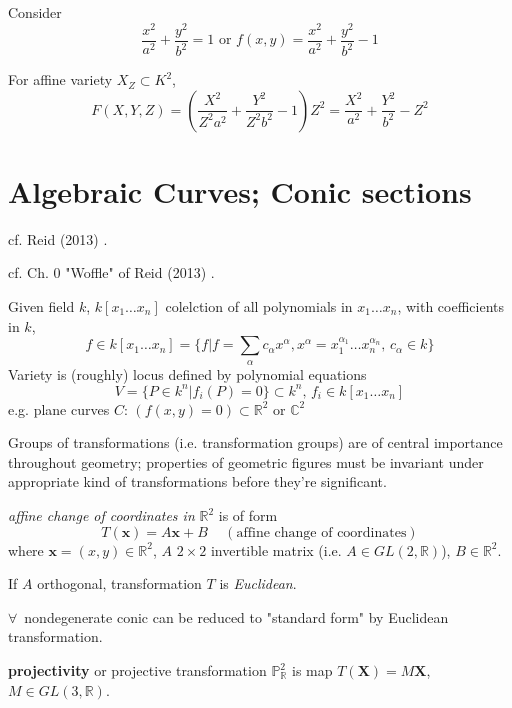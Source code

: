 Consider 
\begin{equation}
\frac{x^2}{a^2} + \frac{y^2}{b^2} = 1 \text{ or } f(x,y) = \frac{x^2}{a^2} + \frac{y^2}{b^2} -1
\end{equation}

For affine variety $X_Z \subset K^2$, 
\begin{equation}
F(X,Y,Z) = \left( \frac{X^2}{Z^2 a^2} + \frac{Y^2}{Z^2 b^2} - 1 \right) Z^2 = \frac{X^2}{a^2} + \frac{Y^2}{b^2} - Z^2
\end{equation}



\section{Algebraic Curves; Conic sections}

cf. Reid (2013) \cite{agat:Reid2013}.

cf. Ch. 0 "Woffle" of Reid (2013) \cite{agat:Reid2013}.

Given field $k$, $k[x_1 \dots x_n]$ colelction of all polynomials in $x_1 \dots x_n$, with coefficients in $k$, 
\[
f  \in k[x_1 \dots x_n] = \lbrace f | f = \sum_{\alpha} c_{\alpha} x^{\alpha}, x^{\alpha} = x_1^{\alpha_1} \dots x_n^{\alpha_n}, \, c_{\alpha} \in k \rbrace 
\]
Variety is (roughly) locus defined by polynomial equations
\[
V = \lbrace P \in k^n | f_i(P) = 0 \rbrace \subset k^n, \, f_i \in k[x_1 \dots x_n]
\]
e.g. plane curves $C$: $(f(x,y) = 0) \subset \mathbb{R}^2$ or $\mathbb{C}^2$


Groups of transformations (i.e. transformation groups) are of central importance throughout geometry; properties of geometric figures must be invariant under appropriate kind of transformations before they're significant.

\emph{affine change of coordinates in} $\mathbb{R}^2$ is of form
\begin{equation}
T(\mathbf{x}) = A \mathbf{x} + B \quad \, (\text{affine change of coordinates})
\end{equation}
where $\mathbf{x} = (x,y) \in \mathbb{R}^2$, $A$ $2\times 2$ invertible matrix (i.e. $A \in GL(2, \mathbb{R})$), $B\in \mathbb{R}^2$. 

If $A$ orthogonal, transformation $T$ is \emph{Euclidean}.

$\forall \, $ nondegenerate conic can be reduced to "standard form" by Euclidean transformation.

\textbf{projectivity} or projective transformation $\mathbb{P}^2_{\mathbb{R}}$ is map $T(\mathbf{X}) = M \mathbf{X}$, $M \in GL(3, \mathbb{R})$.  

